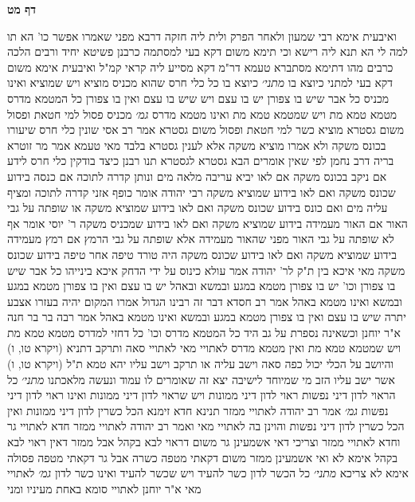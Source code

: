 \documentclass[12pt, openany]{book}
\newcommand{\sethebfont}{
\fontsize{10.5pt}{21.0pt} \selectfont
}
\newcommand{\twocol}[1]{
	{\sethebfont \begin{multicols}{2}
			#1
	\end{multicols}}	
}
\newcommand{\sectname}{}
\newcommand{\newsection}[1]{
	\addcontentsline{toc}{section}{#1}
	\renewcommand{\sectname}{#1}	
	\vspace{-\baselineskip}
	\begin{center}
		\textbf{%
\fontsize{16pt}{16pt}\selectfont
			#1}
	\end{center}
	\vspace{-\baselineskip}
	\nopagebreak
}
\begin{document}
\newsection{דף מט}
\twocol{ואיבעית אימא  רבי שמעון ולאחר הפרק ולית ליה חזקה דרבא
מפני שאמרו אפשר כו' הא תו למה לי  הא תנא ליה רישא 
וכי תימא  משום דקא בעי למסתמה כרבנן פשיטא יחיד ורבים הלכה כרבים 
מהו דתימא  מסתברא טעמא דר"מ דקא מסייע ליה קראי קמ"ל  ואיבעית אימא  משום דקא בעי למתני כיוצא בו
{\large\emph{מתני׳}} כיוצא בו כל כלי חרס שהוא מכניס מוציא ויש שמוציא ואינו מכניס 
כל אבר שיש בו צפורן יש בו עצם ויש שיש בו עצם ואין בו צפורן 
כל המטמא מדרס מטמא טמא מת ויש שמטמא טמא מת ואינו מטמא מדרס
{\large\emph{גמ׳}} מכניס פסול למי חטאת ופסול משום גסטרא מוציא כשר למי חטאת ופסול משום גסטרא
אמר רב אסי  שונין כלי חרס שיעורו בכונס משקה ולא אמרו מוציא משקה אלא לענין גסטרא בלבד  מאי טעמא  אמר מר זוטרא בריה דרב נחמן  לפי שאין אומרים הבא גסטרא לגסטרא 
תנו רבנן  כיצד בודקין כלי חרס לידע אם ניקב בכונס משקה אם לאו  יביא עריבה מלאה מים ונותן קדרה לתוכה אם כנסה בידוע שכונס משקה ואם לאו בידוע שמוציא משקה
רבי יהודה אומר  כופף אזני קדרה לתוכה ומציף עליה מים ואם כונס בידוע שכונס משקה ואם לאו בידוע שמוציא משקה 
או שופתה על גבי האור אם האור מעמידה בידוע שמוציא משקה ואם לאו בידוע שמכניס משקה 
ר' יוסי אומר  אף לא שופתה על גבי האור מפני שהאור מעמידה אלא שופתה על גבי הרמץ  אם רמץ מעמידה בידוע שמוציא משקה ואם לאו בידוע שכונס משקה  היה טורד טיפה אחר טיפה בידוע שכונס משקה 
מאי איכא בין ת"ק לר' יהודה  אמר עולא  כינוס על ידי הדחק איכא בינייהו
כל אבר שיש בו צפורן וכו' יש בו צפורן מטמא במגע ובמשא ובאהל יש בו עצם ואין בו צפורן מטמא במגע ובמשא ואינו מטמא באהל 
אמר רב חסדא דבר זה רבינו הגדול אמרו המקום יהיה בעזרו  אצבע יתרה שיש בו עצם ואין בו צפורן מטמא במגע ובמשא ואינו מטמא באהל 
אמר רבה בר בר חנה א"ר יוחנן  וכשאינה נספרת על גב היד
כל המטמא מדרס וכו' כל דחזי למדרס מטמא טמא מת 
ויש שמטמא טמא מת ואין מטמא מדרס לאתויי מאי  לאתויי סאה ותרקב
דתניא  (ויקרא טו, ו) והיושב על הכלי יכול כפה סאה וישב עליה או תרקב וישב עליו יהא טמא
ת"ל (ויקרא טו, ו) אשר ישב עליו הזב מי שמיוחד לישיבה יצא זה שאומרים לו עמוד ונעשה מלאכתנו
{\large\emph{מתני׳}} כל הראוי לדון דיני נפשות ראוי לדון דיני ממונות ויש שראוי לדון דיני ממונות ואינו ראוי לדון דיני נפשות
{\large\emph{גמ׳}} אמר רב יהודה לאתויי ממזר 
תנינא חדא זימנא  הכל כשרין לדון דיני ממונות ואין הכל כשרין לדון דיני נפשות  והוינן בה  לאתויי מאי  ואמר רב יהודה  לאתויי ממזר  חדא לאתויי גר וחדא לאתויי ממזר 
וצריכי דאי אשמעינן גר משום דראוי לבא בקהל אבל ממזר דאין ראוי לבא בקהל אימא לא 
ואי אשמעינן ממזר משום דקאתי מטפה כשרה אבל גר דקאתי מטפה פסולה אימא לא צריכא
{\large\emph{מתני׳}} כל הכשר לדון כשר להעיד ויש שכשר להעיד ואינו כשר לדון
{\large\emph{גמ׳}} לאתויי מאי א"ר יוחנן  לאתויי סומא באחת מעיניו  ומני}
\end{document}

